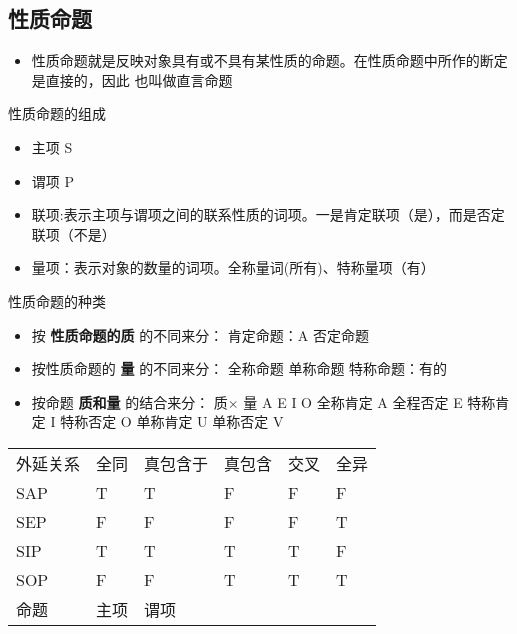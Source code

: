 \documentclass[11pt]{article}
\begin{document}
\subsection{性质命题}
\label{sec-4-2}
\begin{description}
\item[{性质命题}] \begin{itemize}
\item 性质命题就是反映对象具有或不具有某性质的命题。在性质命题中所作的断定是直接的，因此
也叫做直言命题
\end{itemize}
\item 性质命题的组成
\begin{itemize}
\item 主项 S
\item 谓项 P
\item 联项:表示主项与谓项之间的联系性质的词项。一是肯定联项（是），而是否定联项（不是）
\item 量项：表示对象的数量的词项。全称量词(所有)、特称量项（有）
\end{itemize}
\item 性质命题的种类
\begin{itemize}
\item 按 \textbf{性质命题的质} 的不同来分：
肯定命题：A
否定命题
\item 按性质命题的 \textbf{量} 的不同来分：
全称命题
单称命题
特称命题：有的
\item 按命题 \textbf{质和量} 的结合来分：
质$\times$ 量
A E I O
全称肯定 A 全程否定 E 特称肯定 I 特称否定 O 单称肯定 U 单称否定 V
\end{itemize}
\begin{center}
\begin{tabular}{llllll}
外延关系 & 全同 & 真包含于 & 真包含 & 交叉 & 全异\\
SAP & T & T & F & F & F\\
SEP & F & F & F & F & T\\
SIP & T & T & T & T & F\\
SOP & F & F & T & T & T\\
命题 & 主项 & 谓项\\
\end{tabular}
\end{center}

\end{description}
\end{document}
